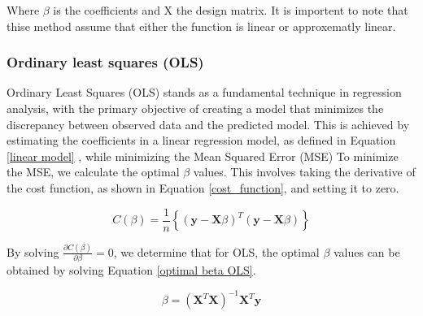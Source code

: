 Where $\beta$ is the coefficients and X the design matrix. It is importent to note 
that thise method assume that either the function is linear or approxematly linear.


\subsubsection{Ordinary least squares (OLS)}
\noindent Ordinary Least Squares (OLS) stands as a fundamental technique in 
regression analysis, with the primary objective of creating a model that 
minimizes the discrepancy between observed data and the predicted model. 
This is achieved by estimating the coefficients in a linear regression model, 
as defined in Equation \eqref{linear model}
, while minimizing the Mean Squared 
Error (MSE) %
To minimize the MSE, we calculate the optimal $\beta$ values. This involves 
taking the derivative of the cost function, as shown in Equation \eqref{cost_function}, 
and setting it to zero.

\begin{equation}
C(\beta) = \frac{1}{n} \left\lbrace ( \textbf{y} - \textbf{X}\beta )^T (\textbf{y} - \textbf{X}\beta)\right\rbrace \label{cost_function}
\end{equation}

\noindent By solving $\frac{\partial C(\beta)}{\partial \beta} = 0$, we determine that 
for OLS, the optimal $\beta$ values can be obtained by solving Equation
\eqref{optimal beta OLS}.

\begin{equation}
\beta = (\textbf{X}^T \textbf{X})^{-1}\textbf{X}^T \textbf{y} \label{optimal beta OLS}
\end{equation}


